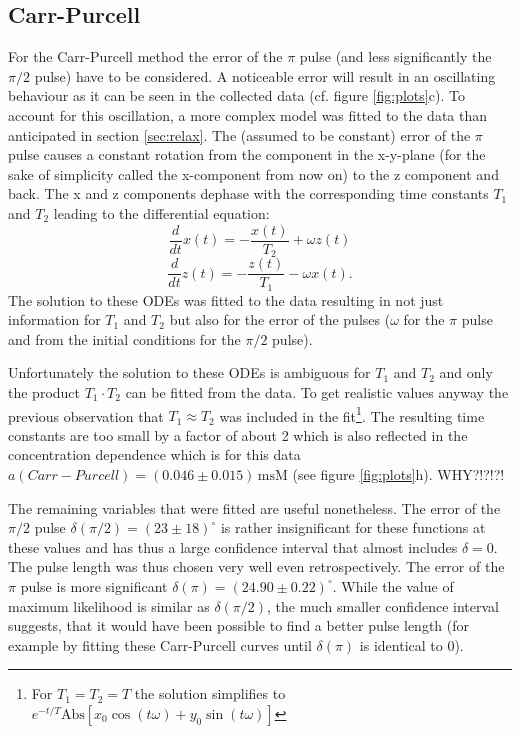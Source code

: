 \documentclass[a4paper]{scrartcl}
\numberwithin{equation}{section}
\numberwithin{figure}{section}
\numberwithin{table}{section}
\newcommand{\eq}[2]{\begin{equation}#1\label{#2}\end{equation}}
\begin{document}
\subsection{Carr-Purcell}
For the Carr-Purcell method the error of the $\pi$ pulse (and less significantly the $\pi/2$ pulse) have to be considered. A noticeable error will result in an oscillating behaviour as it can be seen in the collected data (cf. figure \ref{fig:plots}c). To account for this oscillation, a more complex model was fitted to the data than anticipated in section \ref{sec:relax}. The (assumed to be constant) error of the $\pi$ pulse causes a constant rotation from the component in the x-y-plane (for the sake of simplicity called the x-component from now on) to the z component and back. The x and z components dephase with the corresponding time constants $T_1$ and $T_2$ leading to the differential equation:
\eq{\frac{d}{dt}x(t) = -\frac{x(t)}{T_2} + \omega z(t)}{}
\eq{\frac{d}{dt}z(t) = -\frac{z(t)}{T_1} - \omega x(t) .}{}
The solution to these ODEs was fitted to the data resulting in not just information for $T_1$ and $T_2$ but also for the error of the pulses ($\omega$ for the $\pi$ pulse and from the initial conditions for the $\pi/2$ pulse).

Unfortunately the solution to these ODEs is ambiguous for $T_1$ and $T_2$ and only the product $T_1 \cdot T_2$ can be fitted from the data. To get realistic values anyway the previous observation that $T_1 \approx T_2$ was included in the fit\footnote{For $T_1=T_2=T$ the solution simplifies to $e^{-t/T} \text{Abs}[x_0 \cos(t \omega )+y_0 \sin(t \omega )]$}. The resulting time constants are too small by a factor of about 2 which is also reflected in the concentration dependence which is for this data $a(Carr-Purcell)=(0.046\pm 0.015)\,\text{msM}$ (see figure \ref{fig:plots}h). WHY?!?!?!

The remaining variables that were fitted are useful nonetheless. The error of the $\pi/2$ pulse $\delta(\pi/2) = (23 \pm 18)^\circ$ is rather insignificant for these functions at these values and has thus a large confidence interval that almost includes $\delta = 0$. The pulse length was thus chosen very well even retrospectively. The error of the $\pi$ pulse is more significant $\delta(\pi)=(24.90\pm 0.22)^\circ$. While the value of maximum likelihood is similar as $\delta(\pi/2)$, the much smaller confidence interval suggests, that it would have been possible to find a better pulse length (for example by fitting these Carr-Purcell curves until $\delta(\pi)$ is identical to 0). 


\FloatBarrier
\clearpage
 

\end{document}
